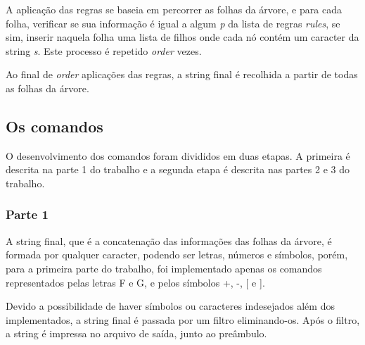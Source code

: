\documentclass[a4paper,12pt]{article}%
\begin{document}
A aplicação das regras se baseia em percorrer as folhas da árvore, e para cada folha, verificar se sua informação 
é igual a algum \emph{p} da lista de regras \emph{rules}, se sim, inserir naquela folha uma lista de filhos onde cada nó contém um 
caracter da string \emph{s}. Este processo é repetido \emph{order} vezes.

Ao final de \emph{order} aplicações das regras, a string final é recolhida a partir de todas as folhas da árvore.



\subsection{Os comandos}

\hspace{1.5em}O desenvolvimento dos comandos foram divididos em duas etapas. A primeira é descrita na parte 1 do trabalho e a 
segunda etapa é descrita nas partes 2 e 3 do trabalho.


\subsubsection{Parte 1}

\hspace{1.5em}A string final, que é a concatenação das informações das folhas da árvore, é formada por qualquer caracter, podendo 
ser letras, números e símbolos, porém, para a primeira parte do trabalho, foi implementado apenas os comandos representados pelas letras 
F e G, e pelos símbolos +, -, [ e ].

Devido a possibilidade de haver símbolos ou caracteres indesejados além dos implementados, a string final é passada por um filtro eliminando-os.
Após o filtro, a string é impressa no arquivo de saída, junto ao preâmbulo.
\end{document}

